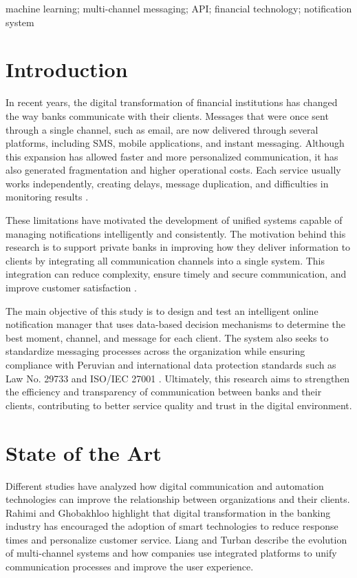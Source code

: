 \documentclass[conference]{IEEEtran}
\newenvironment{customkeywords}{
  \vspace{0.5em}
  \noindent{\emph{\textbf{Keywords -}}}\hspace{0.5em}\itshape
}{\par\vspace{1em}}
\begin{document}
\begin{customkeywords}
machine learning; multi-channel messaging; API; financial technology; notification system
\end{customkeywords}

\section{Introduction}

In recent years, the digital transformation of financial institutions has changed the way banks communicate with their clients. Messages that were once sent through a single channel, such as email, are now delivered through several platforms, including SMS, mobile applications, and instant messaging. Although this expansion has allowed faster and more personalized communication, it has also generated fragmentation and higher operational costs. Each service usually works independently, creating delays, message duplication, and difficulties in monitoring results \cite{rahimi2021,liang2011}.

These limitations have motivated the development of unified systems capable of managing notifications intelligently and consistently. The motivation behind this research is to support private banks in improving how they deliver information to clients by integrating all communication channels into a single system. This integration can reduce complexity, ensure timely and secure communication, and improve customer satisfaction \cite{torres2020}. 

The main objective of this study is to design and test an intelligent online notification manager that uses data-based decision mechanisms to determine the best moment, channel, and message for each client. The system also seeks to standardize messaging processes across the organization while ensuring compliance with Peruvian and international data protection standards such as Law No. 29733 and ISO/IEC 27001 \cite{sbs2021,iso27001}. Ultimately, this research aims to strengthen the efficiency and transparency of communication between banks and their clients, contributing to better service quality and trust in the digital environment.


\section{State of the Art}

Different studies have analyzed how digital communication and automation technologies can improve the relationship between organizations and their clients. Rahimi and Ghobakhloo \cite{rahimi2021} highlight that digital transformation in the banking industry has encouraged the adoption of smart technologies to reduce response times and personalize customer service. Liang and Turban \cite{liang2011} describe the evolution of multi-channel systems and how companies use integrated platforms to unify communication processes and improve the user experience.
\end{document}
